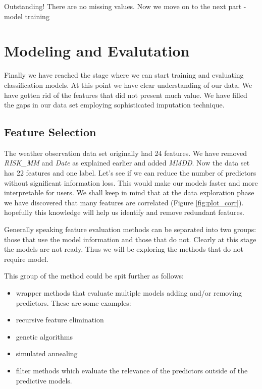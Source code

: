 Outstanding! There are no missing values. Now we move on to the next
part - model training

\hypertarget{modeling-and-evalutation}{%
\section{Modeling and Evalutation}\label{modeling-and-evalutation}}

Finally we have reached the stage where we can start training and
evaluating classification models. At this point we have clear
understanding of our data. We have gotten rid of the features that did
not present much value. We have filled the gaps in our data set
employing sophisticated imputation technique.

\hypertarget{feature-selection}{%
\subsection{Feature Selection}\label{feature-selection}}

The weather observation data set originally had 24 features. We have
removed \emph{RISK\_MM} and \emph{Date} as explained earlier and added
\emph{MMDD}. Now the data set has 22 features and one label. Let's see
if we can reduce the number of predictors without significant
information loss. This would make our models faster and more
interpretable for users. We shall keep in mind that at the data
exploration phase we have discovered that many features are correlated
(Figure \ref{fig:plot_corr}). hopefully this knowledge will help us
identify and remove redundant features.

Generally speaking feature evaluation methods can be separated into two
groups: those that use the model information and those that do not.
Clearly at this stage the models are not ready. Thus we will be
exploring the methods that do not require model.

This group of the method could be spit further as follows:

\begin{itemize}
\item
  wrapper methods that evaluate multiple models adding and/or removing
  predictors. These are some examples:
\item
  recursive feature elimination
\item
  genetic algorithms
\item
  simulated annealing
\item
  filter methods which evaluate the relevance of the predictors outside
  of the predictive models.
\end{itemize}


